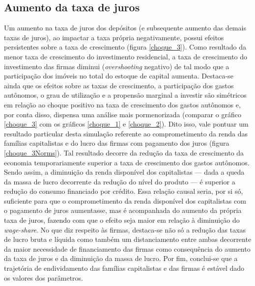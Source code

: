 \subsection*{Aumento da taxa de juros}

Um aumento na taxa de juros dos depósitos (e subsequente aumento das demais taxas de juros), ao impactar a taxa própria negativamente, possui efeitos persistentes sobre a taxa de crescimento (figura \ref{choque_3}). Como resultado da menor taxa de crescimento do investimento residencial, a taxa de crescimento do investimento das firmas diminui (\textit{overshooting} negativo) de tal modo que a participação dos imóveis no total do estoque de capital aumenta. 
Destaca-se ainda que os efeitos sobre as taxas de crescimento, a participação dos gastos autônomos, o grau de utilização e a propensão marginal a investir são simétricos em relação ao choque positivo na taxa de crescimento dos gastos autônomos e, por conta disso, dispensa uma análise mais pormenorizada (comparar o gráfico \ref{choque_3} com os gráficos \ref{choque_1} e \ref{choque_2}).
Dito isso, vale pontuar um resultado particular desta simulação referente ao comprometimento da renda das famílias capitalistas e do lucro das firmas com pagamento dos juros (figura \ref{choque_3Norms}). 
Tal resultado decorre da redução da taxa de crescimento da economia temporariamente superior a taxa de crescimento dos gastos autônomos.
Sendo assim, a diminuição da renda disponível dos capitalistas --- dada a queda da massa de lucro decorrente da redução do nível do produto --- é superior a redução do consumo financiado por crédito.
Essa relação causal seria, por si só, suficiente para que o comprometimento da renda disponível dos capitalistas com o pagamento de juros aumentasse, mas é acompanhada do aumento da própria taxa de juros, fazendo com que o efeito seja maior em relação à diminuição do \textit{wage-share}.
No que diz respeito às firmas, destaca-se não só a redução das taxas de lucro bruta e líquida como também um distanciamento entre ambas decorrente da maior necessidade de financiamento das firmas como consequência do aumento da taxa de juros e da diminuição da massa de lucro.
Por fim, conclui-se que a trajetória de endividamento das famílias capitalistas e das firmas é estável dado os valores dos parâmetros.


